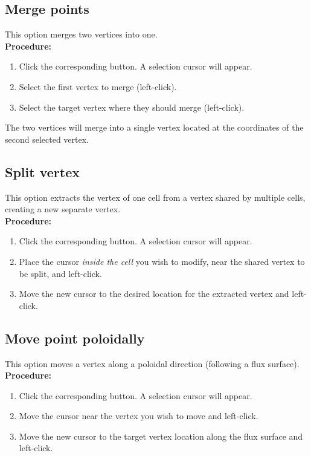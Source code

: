\documentclass[a4paper,12pt]{article}
\begin{document}
  \subsection{Merge points}

  This option merges two vertices into one. \\

  \textbf{Procedure:}
  \begin{enumerate}[itemsep=2pt,topsep=5pt]
    \item Click the corresponding button. A selection cursor will appear.
    \item Select the first vertex to merge (left-click).
    \item Select the target vertex where they should merge (left-click).
  \end{enumerate}
  The two vertices will merge into a single vertex located at the coordinates of the second selected vertex.

  \subsection{Split vertex}

  This option extracts the vertex of one cell from a vertex shared by multiple cells, creating a new separate vertex. \\

  \textbf{Procedure:}
  \begin{enumerate}[itemsep=2pt,topsep=5pt]
    \item Click the corresponding button. A selection cursor will appear.
    \item Place the cursor {\em inside the cell} you wish to modify, near the shared vertex to be split, and left-click.
    \item Move the new cursor to the desired location for the extracted vertex and left-click.
  \end{enumerate}

  \subsection{Move point poloidally}

  This option moves a vertex along a poloidal direction (following a flux surface). \\

  \textbf{Procedure:}
  \begin{enumerate}[itemsep=2pt,topsep=5pt]
    \item Click the corresponding button. A selection cursor will appear.
    \item Move the cursor near the vertex you wish to move and left-click.
    \item Move the new cursor to the target vertex location along the flux surface and left-click.
  \end{enumerate}
\end{document}
